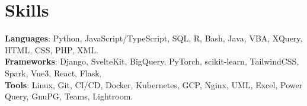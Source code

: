 \documentclass[letterpaper,11pt]{article}
\begin{document}
\section{Skills}
 \begin{itemize}[leftmargin=0.15in, label={}]
    \small{\item{
     \textbf{Languages}{: 
     Python, 
     JavaScript/TypeScript, 
     SQL, 
     R,  
     Bash, 
     Java, 
     VBA, 
     XQuery, 
     HTML, 
     CSS, 
     PHP, 
     XML.
     } \\
     \textbf{Frameworks}{: 
     Django, 
     SvelteKit, 
     BigQuery,
     PyTorch, 
     scikit-learn, 
     TailwindCSS, 
     Spark, 
     Vue3, 
     React, 
     Flask.
     } \\
     \textbf{Tools}{: 
     Linux, 
     Git, 
     CI/CD,
     Docker,
     Kubernetes,
     GCP,
     Nginx, 
     UML, 
     Excel, 
     Power Query, 
     GnuPG, 
     Teams, 
     Lightroom. 
     } \\
    }}
 \end{itemize}


\end{document}
